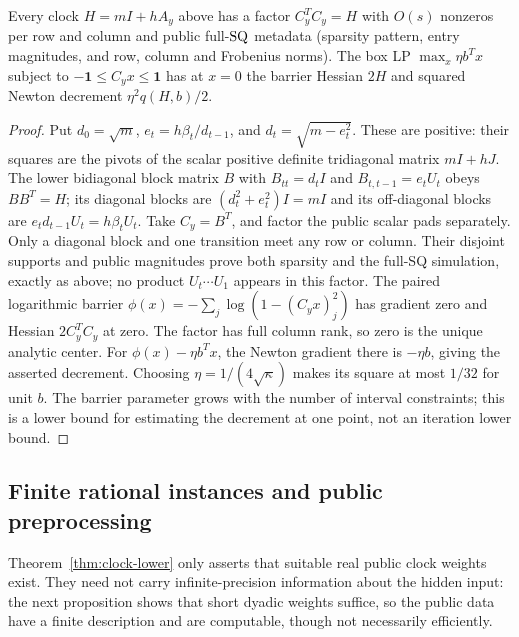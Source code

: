\begin{proposition}\label{prop:box-factor}
Every clock $H=mI+hA_y$ above has a factor $C_y^TC_y=H$ with
$O(s)$ nonzeros per row and column and public full-$\mathrm{SQ}$ metadata
(sparsity pattern, entry magnitudes, and row, column and Frobenius
norms).
The box LP $\max_x\eta b^Tx$ subject to
$-\mathbf1\leq C_yx\leq\mathbf1$ has at $x=0$ the barrier Hessian
$2H$ and squared Newton decrement $\eta^2q(H,b)/2$.
\end{proposition}
\begin{proof}
Put $d_0=\sqrt m$, $e_t=h\beta_t/d_{t-1}$, and
$d_t=\sqrt{m-e_t^2}$. These are positive: their squares are the pivots
of the scalar positive definite tridiagonal matrix $mI+hJ$.
The lower bidiagonal block matrix $B$ with
$B_{tt}=d_tI$ and $B_{t,t-1}=e_tU_t$ obeys $BB^T=H$;
its diagonal blocks are $(d_t^2+e_t^2)I=mI$ and its off-diagonal
blocks are $e_td_{t-1}U_t=h\beta_tU_t$.
Take $C_y=B^T$, and factor the public scalar pads separately.
Only a diagonal block and one transition meet any row or column.
Their disjoint supports and public magnitudes prove both sparsity and
the full-SQ simulation, exactly as above; no product $U_t\cdots U_1$
appears in this factor. The paired logarithmic barrier
$\phi(x)=-\sum_j\log(1-(C_yx)_j^2)$ has gradient zero and Hessian
$2C_y^TC_y$ at zero. The factor has full column rank, so zero is the
unique analytic center. For $\phi(x)-\eta b^Tx$, the Newton gradient
there is $-\eta b$, giving the asserted decrement. Choosing
$\eta=1/(4\sqrt\kappa)$ makes its square at most $1/32$ for unit $b$.
The barrier parameter grows with the number of interval constraints;
this is a lower bound for estimating the decrement at one point, not an
iteration lower bound.
\end{proof}

\subsection{Finite rational instances and public preprocessing}
Theorem~\ref{thm:clock-lower} only asserts that suitable real public
clock weights exist. They need not carry infinite-precision information
about the hidden input: the next proposition shows that short dyadic
weights suffice, so the public data have a finite description and are
computable, though not necessarily efficiently.

